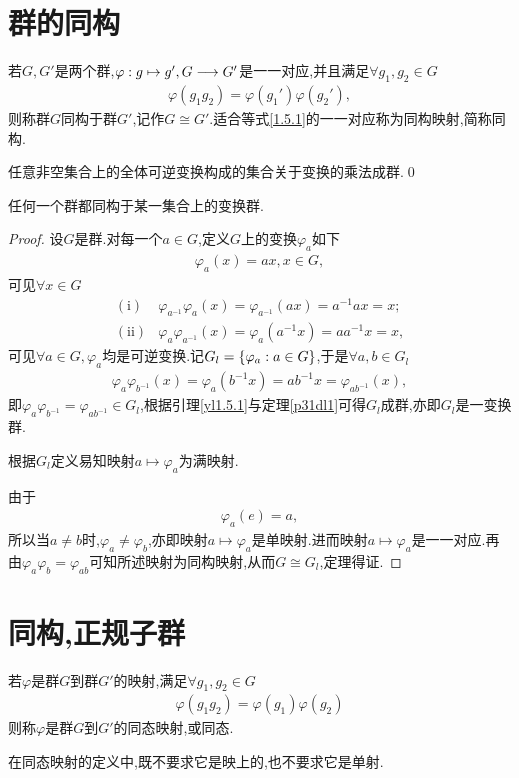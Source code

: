 \section{群的同构}
\begin{definition}[群的同构]
    若$G,G'$是两个群,$\varphi:g\mapsto g',G\longrightarrow G'$是一一对应,并且满足$\forall g_1,g_2\in G$\begin{align}
        \varphi(g_1g_2)=\varphi(g_1')\varphi(g_2'),\label{1.5.1}
    \end{align}则称群$G$同构于群$G'$,记作$G\cong G'$.适合等式\eqref{1.5.1}的一一对应称为同构映射,简称同构.
\end{definition}
\begin{lemma}\label{yl1.5.1}
    任意非空集合上的全体可逆变换构成的集合关于变换的乘法成群.\qed
\end{lemma}
\begin{theorem}[Cayley定理]
    任何一个群都同构于某一集合上的变换群.
\end{theorem}
\begin{proof}
    设$G$是群.对每一个$a\in G$,定义$G$上的变换$\varphi_a$如下\begin{align*}
        \varphi_a(x)=ax,x\in G,
    \end{align*}可见$\forall x\in G$\begin{align*}
        (\text{i})&\varphi_{a^{-1}}\varphi_a(x)=\varphi_{a^{-1}}(ax)=a^{-1}ax=x;\\
        (\text{ii})&\varphi_a\varphi_{a^{-1}}(x)=\varphi_a(a^{-1}x)=aa^{-1}x=x,
    \end{align*}可见$\forall a\in G,\varphi_a$均是可逆变换.记$G_l=\left\{\varphi_a:a\in G\right\}$,于是$\forall a,b\in G_l$\begin{align*}
        \varphi_a\varphi_{b^{-1}}(x)=\varphi_a(b^{-1}x)=ab^{-1}x=\varphi_{ab^{-1}}(x),
    \end{align*}即$\varphi_a\varphi_{b^{-1}}=\varphi_{ab^{-1}}\in G_l$,根据引理\ref{yl1.5.1}与定理\ref{p31dl1}可得$G_l$成群,亦即$G_l$是一变换群.

    根据$G_l$定义易知映射$a\mapsto\varphi_a$为满映射.
    
    由于\begin{align*}
        \varphi_a(e)=a,
    \end{align*}所以当$a\neq b$时,$\varphi_a\neq\varphi_b$,亦即映射$a\mapsto\varphi_a$是单映射.进而映射$a\mapsto\varphi_a$是一一对应.再由$\varphi_a\varphi_b=\varphi_{ab}$可知所述映射为同构映射,从而$G\cong G_l$,定理得证.
\end{proof}
\section{同构,正规子群}
\begin{definition}[同态映射]
    若$\varphi$是群$G$到群$G'$的映射,满足$\forall g_1,g_2\in G$\begin{align*}
        \varphi(g_1g_2)=\varphi(g_1)\varphi(g_2)
    \end{align*}则称$\varphi$是群$G$到$G'$的同态映射,或同态.
\end{definition}
\begin{remark}
    在同态映射的定义中,既不要求它是映上的,也不要求它是单射.
\end{remark}

